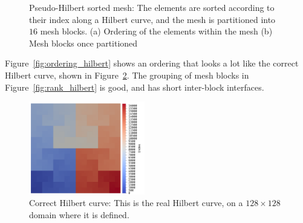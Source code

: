 \begin{figure}[H]
    \centering
    \caption{Pseudo-Hilbert sorted mesh: The elements are sorted according to their index along a Hilbert curve, and the mesh is partitioned into \(16\) mesh blocks. (a) Ordering of the elements within the mesh (b) Mesh blocks once partitioned}\label{fig:mesh_hilbert}
\end{figure}

Figure~\ref{fig:ordering_hilbert} shows an ordering that looks a lot like the correct Hilbert curve,
shown in Figure~\ref{fig:correct_hilbert_numbering}. The grouping of mesh blocks in
Figure~\ref{fig:rank_hilbert} is good, and has short inter-block interfaces.


\begin{figure}[H]
    \centering
    \includegraphics[width=0.45\textwidth]{Chapter_renumbering/media/correct_hilbert_ordering}
    \caption{Correct Hilbert curve: This is the real Hilbert curve, on a \(128 \times 128\) domain where it is defined.}\label{fig:correct_hilbert_numbering}
\end{figure}

